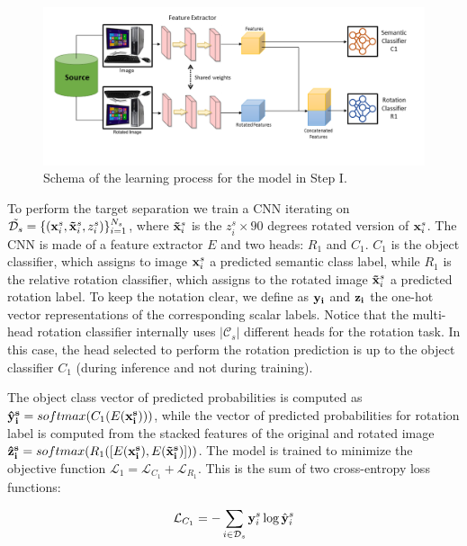 \documentclass[10pt,twocolumn,letterpaper]{article}
\begin{document}
\begin{figure}
  \includegraphics[trim= 0cm 0cm 0cm 0cm, clip, width=\linewidth]{scheme_step1.png}
  \caption{\label{fig:step1} Schema of the learning process for the model in Step I.}
\end{figure}

To perform the target separation we train a CNN iterating on $\tilde{\mathcal{D}_s} = \{({\bf x}_i^s, {\bf \tilde x}_i^s, z_i^s)\}_{i=1}^{N_s}$,
where ${\bf \tilde x}_i^s$ is the $z_i^s\times 90$ degrees rotated version of ${\bf x}_i^s$.
The CNN is made of a feature extractor $E$ and two heads: $R_1$ and $C_1$.
$C_1$ is the object classifier, which assigns to image ${\bf x}_i^s$ a predicted semantic class label,
while $R_1$ is the relative rotation classifier, which assigns to the rotated image ${\bf \tilde x}_i^s$ a predicted rotation label.
To keep the notation clear, we define as ${\bf y_i}$ and ${\bf z_i}$ the one-hot vector representations of the corresponding scalar labels.
Notice that the multi-head rotation classifier internally uses $|\mathcal{C}_s|$ different heads for the rotation task.
In this case, the head selected to perform the rotation prediction is up to the object classifier $C_1$ (during inference and not during training). 

The object class vector of predicted probabilities is computed as ${\bf \hat{y}_i^s} = softmax(C_1(E({\bf x_i^s})))$, while the vector of predicted probabilities
for rotation label is computed from the stacked features of the original and rotated image ${\bf \hat{z}_i^s} = softmax(R_1([E({\bf x_i^s}), E({\bf \tilde{x}_i^s})]))$.
The model is trained to minimize the objective function $\mathcal{L}_1 = \mathcal{L}_{C_1} + \mathcal{L}_{R_1}$.
This is the sum of two cross-entropy loss functions:

\begin{equation}
  \mathcal{L}_{C_1} = -\sum_{i\in\mathcal{D}_s} {\bf y}_i^s \log \hat{\bf y}_i^s
  \label{eq:baseloss_class}
\end{equation}
\end{document}
